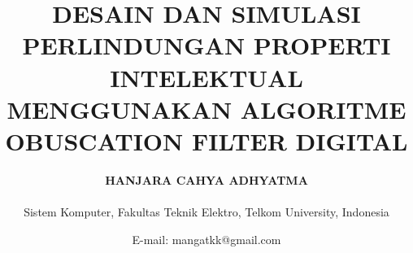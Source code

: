 \title{\vspace{-2.0cm} \textbf{DESAIN DAN SIMULASI PERLINDUNGAN PROPERTI INTELEKTUAL MENGGUNAKAN ALGORITME OBUSCATION FILTER DIGITAL}}
\author{\textbf{HANJARA CAHYA ADHYATMA}\\
	\vspace{0.5pt}\\
	Sistem Komputer, Fakultas Teknik Elektro, Telkom University, Indonesia
}
\date{E-mail: mangatkk@gmail.com}